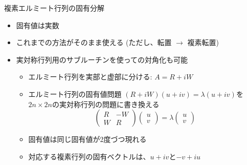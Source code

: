 \begin{frame}[t,fragile]{複素エルミート行列の固有分解}
  \begin{itemize}
  \item 固有値は実数
  \item これまでの方法がそのまま使える (ただし、転置 $\rightarrow$ 複素転置)
  \item 実対称行列用のサブルーチンを使っての対角化も可能
    \begin{itemize}
    \item エルミート行列を実部と虚部に分ける: $A = R + iW$
    \item エルミート行列の固有値問題 $(R + iW)(u+iv) = \lambda(u+iv)$を$2n \times 2n$の実対称行列の問題に書き換える
      \[
      \begin{pmatrix} R & -W \\ W & R \end{pmatrix}
      \begin{pmatrix} u \\ v \end{pmatrix}
      = 
      \lambda \begin{pmatrix} u \\ v \end{pmatrix}
      \]
    \item 固有値は同じ固有値が2度づつ現れる
    \item 対応する複素行列の固有ベクトルは、$u+iv$と$-v+iu$
    \end{itemize}
  \end{itemize}
\end{frame}
